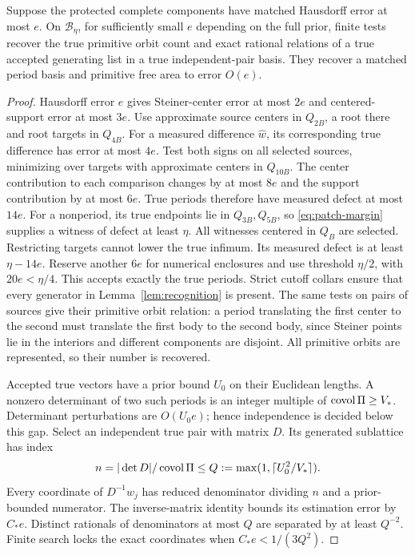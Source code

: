 \begin{lemma}\label{lem:locking}
Suppose the protected complete components have matched Hausdorff
error at most $e$. On $\mathcal B_\eta$, for sufficiently small $e$
depending on the full prior, finite tests recover the true primitive
orbit count and exact rational relations of a true accepted generating
list in a true independent-pair basis. They recover a matched period
basis and primitive free area to error $O(e)$.
\end{lemma}
\begin{proof}
Hausdorff error $e$ gives Steiner-center error at most $2e$ and
centered-support error at most $3e$. Use approximate source centers
in $Q_{2B}$, a root there and root targets in $Q_{4B}$. For a measured
difference $\widehat w$, its corresponding true difference has error
at most $4e$. Test both signs on all selected sources, minimizing over
targets with approximate centers in $Q_{10B}$. The center contribution
to each comparison changes by at most $8e$ and the support contribution
by at most $6e$. True periods therefore have measured defect at most
$14e$. For a nonperiod, its true endpoints lie in $Q_{3B},Q_{5B}$,
so \eqref{eq:patch-margin} supplies a witness of defect at least $\eta$.
All witnesses centered in $Q_B$ are selected. Restricting targets cannot
lower the true infimum. Its measured defect is at least $\eta-14e$.
Reserve another $6e$ for numerical enclosures and use threshold $\eta/2$,
with $20e<\eta/4$. This accepts exactly the true periods. Strict cutoff
collars ensure that every generator in Lemma~\ref{lem:recognition}
is present. The same tests on pairs of sources give their primitive
orbit relation: a period translating the first center to the second
must translate the first body to the second body, since Steiner points
lie in the interiors and different components are disjoint. All
primitive orbits are represented, so their number is recovered.

Accepted true vectors have a prior bound $U_0$ on their Euclidean
lengths. A nonzero determinant of two such periods is an integer
multiple of $\operatorname{covol}\Pi\ge V_*$. Determinant perturbations are
$O(U_0e)$; hence independence is decided below this gap. Select an
independent true pair with matrix $D$. Its generated sublattice has
index
\[
       n=|\det D|/\operatorname{covol}\Pi\le Q:=\max(1,\lceil U_0^2/V_*\rceil).
\]
Every coordinate of $D^{-1}w_j$ has reduced denominator dividing $n$
and a prior-bounded numerator. The inverse-matrix identity bounds its
estimation error by $C_*e$. Distinct rationals of denominators at most
$Q$ are separated by at least $Q^{-2}$. Finite search locks the exact
coordinates when $C_*e<1/(3Q^2)$.


\end{proof}

